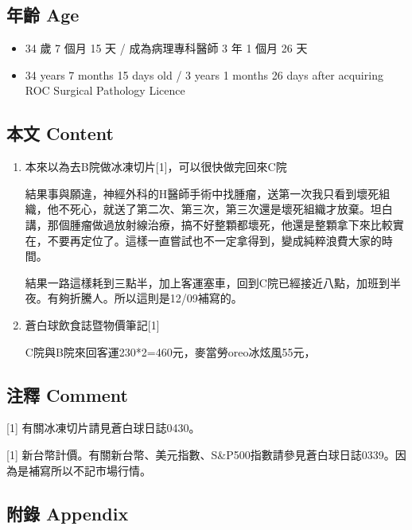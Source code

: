\documentclass[a5paper, 10pt
]{book}
\providecommand{\tightlist}{%
  \setlength{\itemsep}{0pt}\setlength{\parskip}{0pt}}
\begin{document}
\hypertarget{ux5e74ux9f61-age-7}{%
\subsection{年齡 Age}\label{ux5e74ux9f61-age-7}}

\begin{itemize}
\tightlist
\item
  34 歲 7 個月 15 天 / 成為病理專科醫師 3 年 1 個月 26 天
\item
  34 years 7 months 15 days old / 3 years 1 months 26 days after
  acquiring ROC Surgical Pathology Licence
\end{itemize}

\hypertarget{ux672cux6587-content-7}{%
\subsection{本文 Content}\label{ux672cux6587-content-7}}

\begin{enumerate}
\def\labelenumi{\arabic{enumi}.}
\item
  本來以為去B院做冰凍切片{[}1{]}，可以很快做完回來C院

  結果事與願違，神經外科的H醫師手術中找腫瘤，送第一次我只看到壞死組織，他不死心，就送了第二次、第三次，第三次還是壞死組織才放棄。坦白講，那個腫瘤做過放射線治療，搞不好整顆都壞死，他還是整顆拿下來比較實在，不要再定位了。這樣一直嘗試也不一定拿得到，變成純粹浪費大家的時間。

  結果一路這樣耗到三點半，加上客運塞車，回到C院已經接近八點，加班到半夜。有夠折騰人。所以這則是12/09補寫的。
\item
  蒼白球飲食誌暨物價筆記{[}1{]}

  C院與B院來回客運230*2=460元，麥當勞oreo冰炫風55元，
\end{enumerate}

\hypertarget{ux6ce8ux91cb-comment-7}{%
\subsection{注釋 Comment}\label{ux6ce8ux91cb-comment-7}}

{[}1{]} 有關冰凍切片請見蒼白球日誌0430。

{[}1{]}
新台幣計價。有關新台幣、美元指數、S\&P500指數請參見蒼白球日誌0339。因為是補寫所以不記市場行情。

\hypertarget{ux9644ux9304-appendix-7}{%
\subsection{附錄 Appendix}\label{ux9644ux9304-appendix-7}}
\end{document}
